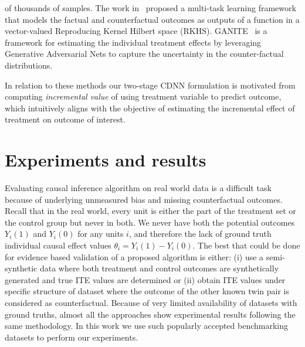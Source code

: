 \documentclass[sigconf]{acmart}
\newcommand{\eat}[1]{}
\theoremstyle{plain}
\numberwithin{equation}{section}
\begin{document}
of thousands of samples. The work in~\cite{cmgp} proposed a multi-task learning framework that models the factual and counterfactual outcomes as outputs of a function in a vector-valued Reproducing Kernel Hilbert space (RKHS). GANITE~\cite{GANITE} is a framework for estimating the individual treatment effects by leveraging Generative Adversarial Nets to capture the uncertainty in the counter-factual distributions. 

In relation to these methods our two-stage CDNN formulation is motivated from computing \emph{incremental value} of using treatment variable to predict outcome, which intuitively aligns with the objective of estimating the incremental effect of treatment on outcome of interest. \eat{To the best of our knowledge, there is no existing work similar to the method proposed in this paper. In addition to the empirical evidence presented in the next section, we firmly believe that no other existing approach is as scalable or extendable as our CDNN method with regard to the aspects discussed in Section~\ref{sec:usecases}.}
\section{Experiments and results}
\label{sec:results}
Evaluating causal inference algorithm on real world data is a difficult task because of underlying unmeasured bias and missing counterfactual outcomes. Recall that in the real world, every unit is either the part of the treatment set or the control group but never in both. We never have both the potential outcomes $Y_i(1)$ and $Y_i(0)$ for any units $i$, and therefore the lack of ground truth individual causal effect values $\theta_i = Y_i(1)-Y_i(0)$. The best that could be done for evidence based validation of a proposed algorithm is either: (i) use a semi-synthetic data where both treatment and control outcomes are synthetically generated and true ITE values are determined or (ii) obtain ITE values under specific structure of dataset where the outcome of the other known twin pair is considered as counterfactual. Because of very limited availability of datasets with ground truths, almost all the approaches show experimental results following the same methodology. In this work we use such popularly accepted benchmarking datasets to perform our experiments.
\end{document}

